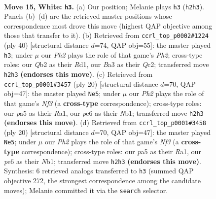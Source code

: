 \documentclass[11pt]{article}
\begin{document}
\clearpage

\begin{figure}[p]\centering
\begin{subfigure}{0.46\textwidth}\centering
\resizebox{\linewidth}{!}{%
\newchessgame
\chessboard[
  setfen={rnbqr1k1/5p2/1p2pnp1/p6p/3P4/B1P2N2/PQ2BPPP/R4RK1 w - - 0 15},
  showmover=false,
  pgfstyle=straightmove, color=movearrow, markmove={h2-h3}
]}
\caption{}
\end{subfigure}\hfill
\begin{subfigure}{0.46\textwidth}\centering
\resizebox{\linewidth}{!}{%
\newchessgame
\chessboard[
  setfen={r5k1/pb2qp2/1pnr3p/3p2p1/8/P1P1PN2/2Q2PPP/R2R1BK1 w - - 0 21},
  showmover=false,
  pgfstyle=straightmove, color=movearrow, markmove={h2-h3}
]}
\caption{}
\end{subfigure}
\\[4pt]
\begin{subfigure}{0.46\textwidth}\centering
\resizebox{\linewidth}{!}{%
\newchessgame
\chessboard[
  setfen={rnbqk2r/4ppbp/5np1/3p4/Pp1P4/1B3N2/1P3PPP/RNBQ1RK1 w kq - 0 11},
  showmover=false,
  pgfstyle=straightmove, color=movearrow, markmove={f3-e5}
]}
\caption{}
\end{subfigure}\hfill
\begin{subfigure}{0.46\textwidth}\centering
\resizebox{\linewidth}{!}{%
\newchessgame
\chessboard[
  setfen={rnbqk2r/4ppbp/5np1/3p4/Pp1P4/1B3N2/1P3PPP/RNBQ1RK1 w kq - 0 11},
  showmover=false,
  pgfstyle=straightmove, color=movearrow, markmove={f3-e5}
]}
\caption{}
\end{subfigure}
\caption{\textbf{Move 15, White: \texttt{h3}.} (a) Our position; Melanie plays \texttt{h3} (\texttt{h2h3}). Panels (b)--(d) are the retrieved master positions whose correspondence most drove this move (highest QAP objective among those that transfer to it). (b) Retrieved from \texttt{ccrl\_top\_p0002\#1224} (ply 40) [structural distance $d$=74, QAP obj=55]: the master played \texttt{h3}; under $\mu$ our \emph{Ph2} plays the role of that game's \emph{Ph2}; cross-type roles: our \emph{Q}b2 as their \emph{R}d1, our \emph{B}a3 as their \emph{Q}c2; transferred move \texttt{h2h3} \textbf{(endorses this move)}. (c) Retrieved from \texttt{ccrl\_top\_p0001\#3457} (ply 20) [structural distance $d$=70, QAP obj=47]: the master played \texttt{Ne5}; under $\mu$ our \emph{Ph2} plays the role of that game's \emph{Nf3} (a \textbf{cross-type} correspondence); cross-type roles: our \emph{p}a5 as their \emph{R}a1, our \emph{p}e6 as their \emph{N}b1; transferred move \texttt{h2h3} \textbf{(endorses this move)}. (d) Retrieved from \texttt{ccrl\_top\_p0001\#3458} (ply 20) [structural distance $d$=70, QAP obj=47]: the master played \texttt{Ne5}; under $\mu$ our \emph{Ph2} plays the role of that game's \emph{Nf3} (a \textbf{cross-type} correspondence); cross-type roles: our \emph{p}a5 as their \emph{R}a1, our \emph{p}e6 as their \emph{N}b1; transferred move \texttt{h2h3} \textbf{(endorses this move)}. Synthesis: 6 retrieved analogs transferred to \texttt{h3} (summed QAP objective 272, the strongest correspondence among the candidate moves); Melanie committed it via the \texttt{search} selector.}
\label{fig:thought-m28}
\end{figure}
\end{document}
